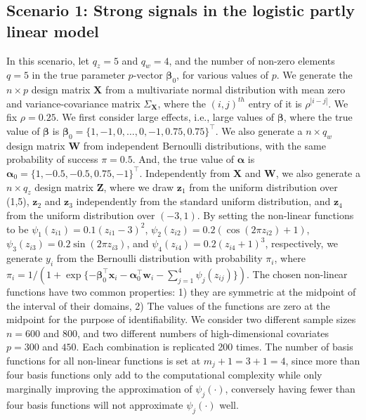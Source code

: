 \documentclass[11pt]{article}
\begin{document}
\subsection*{Scenario 1: Strong signals in the logistic partly linear model}
In this scenario, let $q_z=5$ and $q_w=4$, and the number of non-zero elements $q=5$ in the true parameter $p$-vector $\boldsymbol{\beta}_0$,  for various values of $p$. We generate the $n\times p$ design matrix $\textbf{X}$ from a multivariate normal distribution with mean zero and variance-covariance matrix $\Sigma_\textbf{X}$, where the $(i,j)^{th}$ entry of it is $\rho^{|i-j|}$. We fix $\rho=0.25$. We first consider large effects, i.e., large values of $\boldsymbol{\beta}$, where the true value of $\boldsymbol{\beta}$ is $\boldsymbol{\beta}_0= \{ 1,-1,0,\ldots,0,-1,0.75,0.75 \}^\top$. We also generate a $n \times q_w$ design matrix $\textbf{W}$ from independent Bernoulli distributions, with the same probability of success $\pi=0.5$. And, the true value of $\boldsymbol{\alpha}$ is $\boldsymbol{\alpha}_0= \{1,-0.5,-0.5,0.75,-1\}^\top$. Independently from $\textbf{X}$ and $\textbf{W}$, we also generate a $n \times q_z$ design matrix $\textbf{Z}$, where we draw $\textbf{z}_1$ from the uniform distribution over (1,5), $\textbf{z}_2$ and $\textbf{z}_3$  independently from the standard uniform distribution, and $\textbf{z}_4$ from the uniform distribution over $(-3,1)$. By setting the non-linear functions to be $\psi_1(z_{i1}) = 0.1(z_{i1}-3)^2$, $\psi_2(z_{i2}) = 0.2(\cos(2\pi z_{i2})+1)$, $\psi_3(z_{i3}) = 0.2\sin(2\pi z_{i3})$, and $\psi_4 (z_{i4}) = 0.2(z_{i4}+1)^3$, respectively, we generate $y_i$ from the Bernoulli distribution with probability $\pi_i$, where $\pi_i = 1/(1+\exp\{-\boldsymbol{\beta}_0^\top \textbf{x}_i - \boldsymbol{\alpha}_0^\top \textbf{w}_i - \sum^4_{j=1} \psi_j(z_{ij})\})$. The chosen non-linear functions have two common properties: 1) they are symmetric at the midpoint of the interval of their domains, 2) The values of the functions are zero at the midpoint for the purpose of identifiability. We consider two different sample sizes $n=600$ and $800$, and two different numbers of high-dimensional covariates $p=300$ and $450$. Each combination is replicated 200 times. The number of basis functions for all non-linear functions is set at $m_j+1=3+1=4$, since more than four basis functions only add to the computational complexity while only marginally improving the approximation of $\psi_j(\cdot)$, conversely having fewer than four basis functions will not approximate $\psi_j(\cdot)$ well. 
\end{document}

